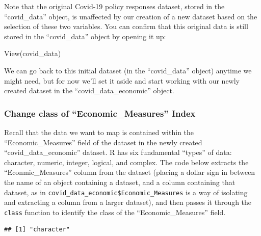 \documentclass[
]{article}
\newenvironment{Shaded}{\begin{snugshade}}{\end{snugshade}}
\newcommand{\CommentTok}[1]{\textcolor[rgb]{0.56,0.35,0.01}{\textit{#1}}}
\newcommand{\FunctionTok}[1]{\textcolor[rgb]{0.00,0.00,0.00}{#1}}
\newcommand{\NormalTok}[1]{#1}
\newcommand{\SpecialCharTok}[1]{\textcolor[rgb]{0.00,0.00,0.00}{#1}}
\begin{document}
Note that the original Covid-19 policy responses dataset, stored in the ``covid\_data'' object, is unaffected by our creation of a new dataset based on the selection of these two variables. You can confirm that this original data is still stored in the ``covid\_data'' object by opening it up:

\begin{Shaded}
\begin{Highlighting}[]
\FunctionTok{View}\NormalTok{(covid\_data)}
\end{Highlighting}
\end{Shaded}

We can go back to this initial dataset (in the ``covid\_data'' object) anytime we might need, but for now we'll set it aside and start working with our newly created dataset in the ``covid\_data\_economic'' object.

\hypertarget{change-class-of-economic_measures-index}{%
\subsubsection{Change class of ``Economic\_Measures'' Index}\label{change-class-of-economic_measures-index}}

Recall that the data we want to map is contained within the ``Economic\_Measures'' field of the dataset in the newly created ``covid\_data\_economic'' dataset. R has six fundamental ``types'' of data: character, numeric, integer, logical, and complex. The code below extracts the ``Econmic\_Measures'' column from the dataset (placing a dollar sign in between the name of an object containing a dataset, and a column containing that dataset, as in \texttt{covid\_data\_economic\$Economic\_Measures} is a way of isolating and extracting a column from a larger dataset), and then passes it through the \texttt{class} function to identify the class of the ``Economic\_Measures'' field.

\begin{Shaded}
\end{Shaded}

\begin{verbatim}
## [1] "character"
\end{verbatim}
\end{document}
